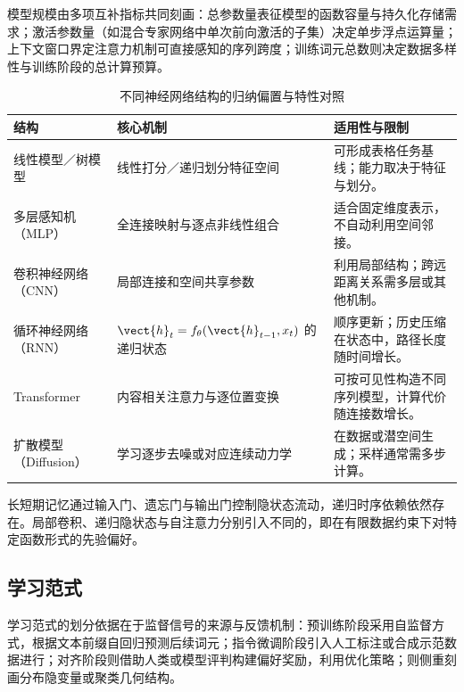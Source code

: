 \documentclass[../textbook.tex]{subfiles}
\begin{document}
模型规模由多项互补指标共同刻画：总参数量表征模型的函数容量与持久化存储需求；激活参数量（如混合专家网络中单次前向激活的子集）决定单步浮点运算量；上下文窗口界定注意力机制可直接感知的序列跨度；训练词元总数则决定数据多样性与训练阶段的总计算预算。

\begin{table}[htbp]
\centering
\caption{不同神经网络结构的归纳偏置与特性对照}\label{tab:intro-structures}
\begin{tabularx}{\linewidth}{@{}p{32mm}XX@{}}
\toprule 结构 & 核心机制 & 适用性与限制\\\midrule
线性模型／树模型 & 线性打分／递归划分特征空间 & 可形成表格任务基线；能力取决于特征与划分。\\
多层感知机（MLP） & 全连接映射与逐点非线性组合 & 适合固定维度表示，不自动利用空间邻接。\\
卷积神经网络（CNN） & 局部连接和空间共享参数 & 利用局部结构；跨远距离关系需多层或其他机制。\\
循环神经网络（RNN） & $\vect{h}_t=f_\theta(\vect{h}_{t-1},x_t)$ 的递归状态 & 顺序更新；历史压缩在状态中，路径长度随时间增长。\\
Transformer & 内容相关注意力与逐位置变换 & 可按可见性构造不同序列模型，计算代价随连接数增长。\\
扩散模型（Diffusion） & 学习逐步去噪或对应连续动力学 & 在数据或潜空间生成；采样通常需多步计算。\\
\bottomrule
\end{tabularx}
\end{table}
长短期记忆通过输入门、遗忘门与输出门控制隐状态流动，递归时序依赖依然存在。局部卷积、递归隐状态与自注意力分别引入不同的，即在有限数据约束下对特定函数形式的先验偏好。

\subsection{学习范式}
\label{sec:intro-learning-map}
学习范式的划分依据在于监督信号的来源与反馈机制：预训练阶段采用自监督方式，根据文本前缀自回归预测后续词元；指令微调阶段引入人工标注或合成示范数据进行；对齐阶段则借助人类或模型评判构建偏好奖励，利用优化策略；则侧重刻画分布隐变量或聚类几何结构。
\end{document}
